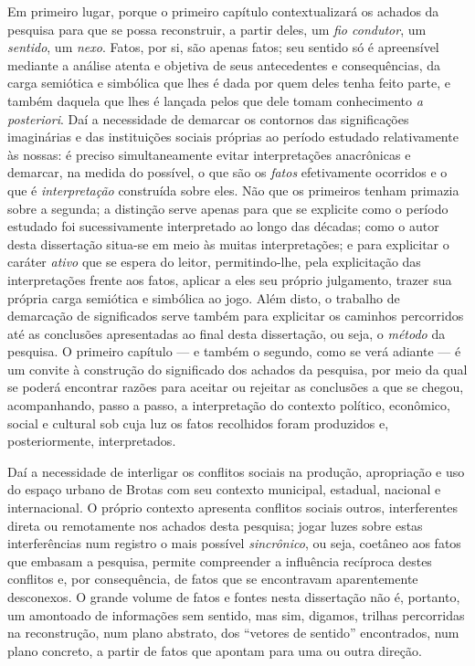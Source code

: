 Em primeiro lugar, porque o primeiro capítulo contextualizará os achados da pesquisa para que se possa reconstruir, a partir deles, um \textit{fio condutor}, um \textit{sentido}, um \textit{nexo}. Fatos, por si, são apenas fatos; seu sentido só é apreensível mediante a análise atenta e objetiva de seus antecedentes e consequências, da carga semiótica e simbólica que lhes é dada por quem deles tenha feito parte, e também daquela que lhes é lançada pelos que dele tomam conhecimento \textit{a posteriori}. Daí a necessidade de demarcar os contornos das significações imaginárias e das instituições sociais próprias ao período estudado relativamente às nossas: é preciso simultaneamente evitar interpretações anacrônicas e demarcar, na medida do possível, o que são os \textit{fatos} efetivamente ocorridos e o que é \textit{interpretação} construída sobre eles. Não que os primeiros tenham primazia sobre a segunda; a distinção serve apenas para que se explicite como o período estudado foi sucessivamente interpretado ao longo das décadas; como o autor desta dissertação situa-se em meio às muitas interpretações; e para explicitar o caráter \textit{ativo} que se espera do leitor, permitindo-lhe, pela explicitação das interpretações frente aos fatos, aplicar a eles seu próprio julgamento, trazer sua própria carga semiótica e simbólica ao jogo. Além disto, o trabalho de demarcação de significados serve também para explicitar os caminhos percorridos até as conclusões apresentadas ao final desta dissertação, ou seja, o \textit{método} da pesquisa. O primeiro capítulo --- e também o segundo, como se verá adiante --- é um convite à construção do significado dos achados da pesquisa, por meio da qual se poderá encontrar razões para aceitar ou rejeitar as conclusões a que se chegou, acompanhando, passo a passo, a interpretação do contexto político, econômico, social e cultural sob cuja luz os fatos recolhidos foram produzidos e, posteriormente, interpretados.

Daí a necessidade de interligar os conflitos sociais na produção, apropriação e uso do espaço urbano de Brotas com seu contexto municipal, estadual, nacional e internacional. O próprio contexto apresenta conflitos sociais outros, interferentes direta ou remotamente nos achados desta pesquisa; jogar luzes sobre estas interferências num registro o mais possível \textit{sincrônico}, ou seja, coetâneo aos fatos que embasam a pesquisa, permite compreender a influência recíproca destes conflitos e, por consequência, de fatos que se encontravam aparentemente desconexos. O grande volume de fatos e fontes nesta dissertação não é, portanto, um amontoado de informações sem sentido, mas sim, digamos, trilhas percorridas na reconstrução, num plano abstrato, dos ``vetores de sentido'' encontrados, num plano concreto, a partir de fatos que apontam para uma ou outra direção.


